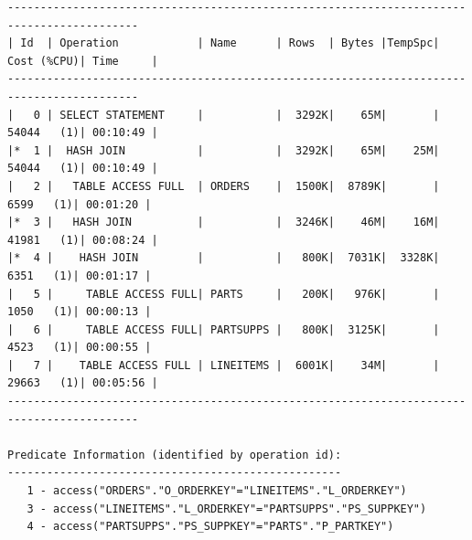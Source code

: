 \documentclass[10pt]{article}
\begin{document}
\begin{lstlisting}[style=queryexecutionplan]
------------------------------------------------------------------------------------------
| Id  | Operation            | Name      | Rows  | Bytes |TempSpc| Cost (%CPU)| Time     |
------------------------------------------------------------------------------------------
|   0 | SELECT STATEMENT     |           |  3292K|    65M|       | 54044   (1)| 00:10:49 |
|*  1 |  HASH JOIN           |           |  3292K|    65M|    25M| 54044   (1)| 00:10:49 |
|   2 |   TABLE ACCESS FULL  | ORDERS    |  1500K|  8789K|       |  6599   (1)| 00:01:20 |
|*  3 |   HASH JOIN          |           |  3246K|    46M|    16M| 41981   (1)| 00:08:24 |
|*  4 |    HASH JOIN         |           |   800K|  7031K|  3328K|  6351   (1)| 00:01:17 |
|   5 |     TABLE ACCESS FULL| PARTS     |   200K|   976K|       |  1050   (1)| 00:00:13 |
|   6 |     TABLE ACCESS FULL| PARTSUPPS |   800K|  3125K|       |  4523   (1)| 00:00:55 |
|   7 |    TABLE ACCESS FULL | LINEITEMS |  6001K|    34M|       | 29663   (1)| 00:05:56 |
------------------------------------------------------------------------------------------
 
Predicate Information (identified by operation id):
---------------------------------------------------
   1 - access("ORDERS"."O_ORDERKEY"="LINEITEMS"."L_ORDERKEY")
   3 - access("LINEITEMS"."L_ORDERKEY"="PARTSUPPS"."PS_SUPPKEY")
   4 - access("PARTSUPPS"."PS_SUPPKEY"="PARTS"."P_PARTKEY")
\end{lstlisting}
\end{document}

